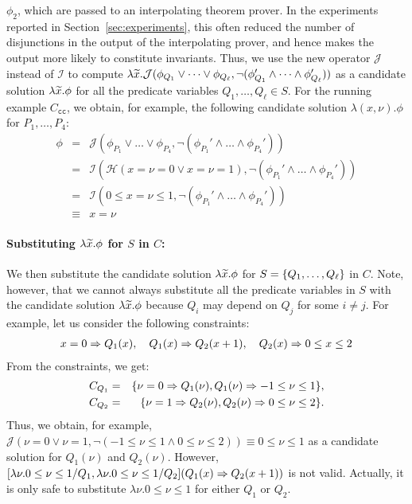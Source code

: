 \(\phi_2\), which are passed to an interpolating theorem prover.
In the experiments reported in Section~\ref{sec:experiments}, this often
reduced the number of disjunctions in the output of the interpolating
prover, and hence makes the output more likely to constitute invariants.
%
Thus, we use the new operator \(\mathcal{J}\) instead of \(\mathcal{I}\)
to compute \(\lambda \widetilde{x}. \mathcal{J}(\phi_{Q_1} \lor \dots\lor
\phi_{Q_{\ell}},\neg (\phi_{Q_1}' \land \dots \land\phi_{Q_{\ell}}'))\)
as a candidate solution \(\lambda \widetilde{x}. \phi\) for all the predicate
variables \(Q_1,\dots,Q_{\ell} \in S\).  For the running example
\(C_{\texttt{cc}}\), we obtain, for example, the following candidate
solution \(\lambda (x, \nu). \phi\) for \(P_1,\dots,P_4\):
\begin{eqnarray*}
\phi&=& \mathcal{J}(\phi_{P_1} \lor \dots \lor \phi_{P_4},\neg (\phi_{P_1}' \land \dots \land \phi_{P_4}')) \\
&=& \mathcal{I}(\mathcal{H}(x=\nu=0 \lor x=\nu=1),\neg (\phi_{P_1}' \land \dots \land \phi_{P_4}')) \\
&=& \mathcal{I}(0 \leq x=\nu \leq 1,\neg (\phi_{P_1}' \land \dots \land \phi_{P_4}')) \\
&\equiv& x=\nu
\end{eqnarray*}

\paragraph{Substituting \(\lambda \widetilde{x}.\phi\) for \(S\) in \(C\):}
We then substitute the candidate solution \(\lambda \widetilde{x}.\phi\) for
\(S=\{{Q_1,\dots,Q_{\ell}}\}\) in \(C\).  Note, however, that we cannot
always substitute all the predicate variables in \(S\) with the
candidate solution \(\lambda\widetilde{x}.\phi\) because \(Q_i\) may depend on
\(Q_j\) for some \(i \neq j\).  For example, let us consider the
following constraints:
\begin{eqnarray*}
x=0 \Rightarrow Q_1(x), \quad
Q_1(x) \Rightarrow Q_2(x+1), \quad
Q_2(x) \Rightarrow 0 \leq x \leq 2
\end{eqnarray*}
From the constraints, we get:
\begin{eqnarray*}
C_{Q_1}&=&\{\nu=0 \Rightarrow Q_1(\nu), Q_1(\nu) \Rightarrow -1 \leq \nu\leq 1\}, \\
C_{Q_2}&=&\{\nu=1 \Rightarrow Q_2(\nu), Q_2(\nu) \Rightarrow 0 \leq \nu \leq 2\}.
\end{eqnarray*}
Thus, we obtain, for example, \(\mathcal{J}(\nu=0 \lor \nu=1,\neg (-1
\leq \nu\leq 1 \land 0 \leq \nu \leq 2)) \equiv 0 \leq \nu \leq 1\) as a
candidate solution for \(Q_1(\nu)\) and \(Q_2(\nu)\).  However,
\([\lambda\nu.0 \leq \nu \leq 1/Q_1,\lambda \nu.0 \leq \nu \leq
1/Q_2](Q_1(x) \Rightarrow Q_2(x+1))\) is not valid.  Actually, it is only
safe to substitute \(\lambda \nu.0 \leq \nu\leq 1\) for either \(Q_1\)
or \(Q_2\).

